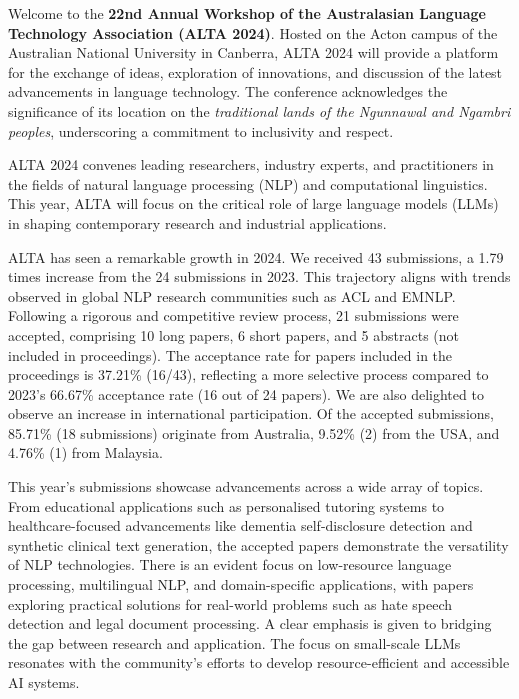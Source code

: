 
Welcome to the \textbf{22nd Annual Workshop of the Australasian Language Technology Association (ALTA 2024)}. Hosted on the Acton campus of the Australian National University in Canberra, ALTA 2024 will provide a platform for the exchange of ideas, exploration of innovations, and discussion of the latest advancements in language technology. The conference acknowledges the significance of its location on the \textit{traditional lands of the Ngunnawal and Ngambri peoples}, underscoring a commitment to inclusivity and respect.\newline

ALTA 2024 convenes leading researchers, industry experts, and practitioners in the fields of natural language processing (NLP) and computational linguistics. This year, ALTA will focus on the critical role of large language models (LLMs) in shaping contemporary research and industrial applications.\newline %

ALTA has seen a remarkable growth in 2024. We received 43 submissions, a 1.79 times increase from the 24 submissions in 2023. This trajectory aligns with trends observed in global NLP research communities such as ACL and EMNLP. Following a rigorous and competitive review process, 21 submissions were accepted, comprising 10 long papers, 6 short papers, and 5 abstracts (not included in proceedings). The acceptance rate for papers included in the proceedings is 37.21\% (16/43), reflecting a more selective process compared to 2023’s 66.67\% acceptance rate (16 out of 24 papers). We are also delighted to observe an increase in international participation. Of the accepted submissions, 85.71\% (18 submissions) originate from Australia, 9.52\% (2) from the USA, and 4.76\% (1) from Malaysia.\newline

This year's submissions showcase advancements across a wide array of topics. From educational applications such as personalised tutoring systems to healthcare-focused advancements like dementia self-disclosure detection and synthetic clinical text generation, the accepted papers demonstrate the versatility of NLP technologies. There is an evident focus on low-resource language processing, multilingual NLP, and domain-specific applications, with papers exploring practical solutions for real-world problems such as hate speech detection and legal document processing. A clear emphasis is given to bridging the gap between research and application. The focus on small-scale LLMs resonates with the community's efforts to develop resource-efficient and accessible AI systems.\newline 

